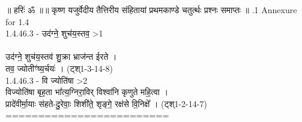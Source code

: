 \documentclass[17pt]{extarticle}
\begin{document}
        ॥ हरिः॑ ॐ ॥॥ कृष्ण यजुर्वेदीय तैत्तिरीय संहितायां प्रथमकाण्डे चतुर्त्थः प्रश्नः समाप्तः ॥ \newline
        .1   Annexure for 1.4\\1.4.46.3 - उद॑ग्ने॒ शुच॑य॒स्तव॒ >1 \\\\उद॑ग्ने॒ शुच॑य॒स्तव॑ शु॒क्रा भ्राज॑न्त ईरते । \\तव॒ ज्योतीꣳ॑ष्य॒र्चयः॑ । (ट्श्1-3-14-8)\\1.4.46.3 - वि ज्योति॑षा >2 \\विज्योति॑षा बृह॒ता भा᳚त्य॒ग्निरा॒विर् विश्वा॑नि कृणुते महि॒त्वा । \\प्रादे॑वीर्मा॒याः स॑हते-दु॒रेवाः॒ शिशी॑ते॒ शृङ्गे॒ रक्ष॑से वि॒निक्षे᳚ । (ट्श्1-2-14-7)\\=========================\\
                \pagebreak
        
\end{document}
